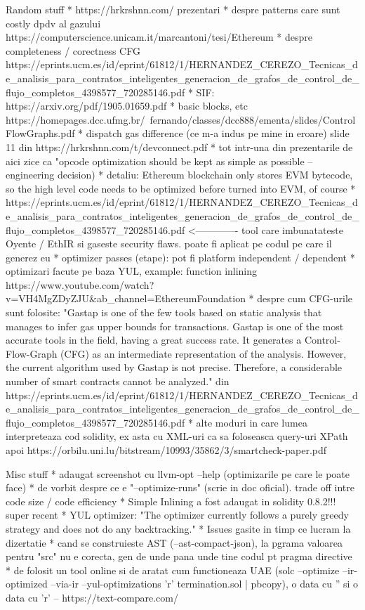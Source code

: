 Random stuff
  * https://hrkrshnn.com/ prezentari
  * despre patterns care sunt costly dpdv al gazului https://computerscience.unicam.it/marcantoni/tesi/Ethereum%
  * despre completeness / corectness CFG https://eprints.ucm.es/id/eprint/61812/1/HERNANDEZ_CEREZO_Tecnicas_de_analisis_para_contratos_inteligentes_generacion_de_grafos_de_control_de_flujo_completos_4398577_720285146.pdf
  * SIF: https://arxiv.org/pdf/1905.01659.pdf
  * basic blocks, etc https://homepages.dcc.ufmg.br/~fernando/classes/dcc888/ementa/slides/ControlFlowGraphs.pdf
  * dispatch gas difference (ce m-a indus pe mine in eroare) slide 11 din https://hrkrshnn.com/t/devconnect.pdf
    * tot intr-una din prezentarile de aici zice ca "opcode optimization should be kept as simple as possible – engineering decision)
  * detaliu: Ethereum blockchain only stores EVM bytecode, so the high level code needs to be optimized before turned into EVM, of course
  * https://eprints.ucm.es/id/eprint/61812/1/HERNANDEZ_CEREZO_Tecnicas_de_analisis_para_contratos_inteligentes_generacion_de_grafos_de_control_de_flujo_completos_4398577_720285146.pdf     <------------- tool care imbunatateste Oyente / EthIR si gaseste security flaws. poate fi aplicat pe codul pe care il generez eu
  * optimizer passes (etape): pot fi platform independent / dependent
  * optimizari facute pe baza YUL, example: function inlining https://www.youtube.com/watch?v=VH4MgZDyZJU&ab_channel=EthereumFoundation
  * despre cum CFG-urile sunt folosite: "Gastap is one of the few tools based on static analysis that manages to infer gas upper
  bounds for transactions. Gastap is one of the most accurate tools in the field, having a
  great success rate. It generates a Control-Flow-Graph (CFG) as an intermediate representation of the analysis. However, the current algorithm used by Gastap is not precise.
  Therefore, a considerable number of smart contracts cannot be analyzed." din https://eprints.ucm.es/id/eprint/61812/1/HERNANDEZ_CEREZO_Tecnicas_de_analisis_para_contratos_inteligentes_generacion_de_grafos_de_control_de_flujo_completos_4398577_720285146.pdf
  * alte moduri in care lumea interpreteaza cod solidity, ex asta cu XML-uri ca sa foloseasca query-uri XPath apoi https://orbilu.uni.lu/bitstream/10993/35862/3/smartcheck-paper.pdf



Misc stuff
* adaugat screenshot cu llvm-opt --help (optimizarile pe care le poate face)
* de vorbit despre ce e "--optimize-runs" (scrie in doc oficial). trade off intre code size / code efficiency
* Simple Inlining a fost adaugat in solidity 0.8.2!!! super recent
* YUL optimizer: "The optimizer currently follows a purely greedy strategy and does not do any backtracking."
* Issues gasite in timp ce lucram la dizertatie
  * cand se construieste AST (--ast-compact-json), la pgrama valoarea pentru "src" nu e corecta, gen de unde pana unde tine codul pt pragma directive
* de folosit un tool online si de aratat cum functioneaza UAE (solc --optimize --ir-optimized --via-ir --yul-optimizations 'r'  termination.sol | pbcopy), o data cu '' si o data cu 'r'    –   https://text-compare.com/

